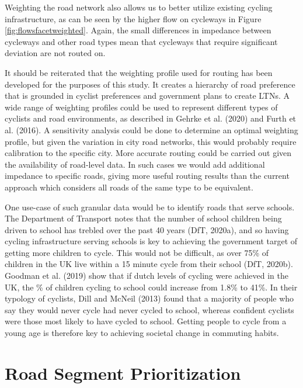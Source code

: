 \documentclass[
]{article}
\begin{document}
Weighting the road network also allows us to better utilize existing
cycling infrastructure, as can be seen by the higher flow on cycleways
in Figure \ref{fig:flowsfacetweighted}. Again, the small differences in
impedance between cycleways and other road types mean that cycleways
that require significant deviation are not routed on.

It should be reiterated that the weighting profile used for routing has
been developed for the purposes of this study. It creates a hierarchy of
road preference that is grounded in cyclist preferences and government
plans to create LTNs. A wide range of weighting profiles could be used
to represent different types of cyclists and road environments, as
described in Gehrke et al. (2020) and Furth et al. (2016). A sensitivity
analysis could be done to determine an optimal weighting profile, but
given the variation in city road
networks, this would probably
require calibration to the specific city. More accurate routing could be
carried out given the availability of road-level data. In such cases we
would add additional impedance to specific roads, giving more useful
routing results than the current approach which considers all roads
of the same type to be equivalent.

One use-case of such granular data would be to identify roads that serve
schools. The Department of Transport notes that the number of school
children being driven to school has trebled over the past 40 years
(DfT, 2020a), and so having cycling infrastructure
serving schools is key to achieving the government target of getting
more children to cycle. This would not be difficult, as over 75\% of
children in the UK live within a 15 minute cycle from their school
(DfT, 2020b). Goodman et al. (2019) show that if
dutch levels of cycling were achieved in the UK, the \% of children
cycling to school could increase from 1.8\% to 41\%. In their typology of
cyclists, Dill and McNeil (2013) found that a majority of people who say they
would never cycle had never cycled to school, whereas confident cyclists
were those most likely to have cycled to school. Getting people to cycle
from a young age is therefore key to achieving societal change in
commuting habits.

\hypertarget{road-segment-prioritization}{%
\section{Road Segment Prioritization}\label{road-segment-prioritization}}
\end{document}
